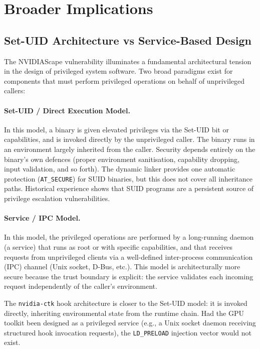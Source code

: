 \section{Broader Implications}
\label{sec:implications}

\subsection{Set-UID Architecture vs Service-Based Design}
\label{subsec:setuid-vs-service}

The NVIDIAScape vulnerability illuminates a fundamental architectural tension in the design of privileged system software. Two broad paradigms exist for components that must perform privileged operations on behalf of unprivileged callers:
 
\paragraph{Set-UID / Direct Execution Model.} In this model, a binary is given elevated privileges via the Set-UID bit or capabilities, and is invoked directly by the unprivileged caller. The binary runs in an environment largely inherited from the caller. Security depends entirely on the binary's own defences (proper environment sanitisation, capability dropping, input validation, and so forth). The dynamic linker provides one automatic protection (\texttt{AT\_SECURE}) for SUID binaries, but this does not cover all inheritance paths. Historical experience shows that SUID programs are a persistent source of privilege escalation vulnerabilities.
 
\paragraph{Service / IPC Model.} In this model, the privileged operations are performed by a long-running daemon (a service) that runs as root or with specific capabilities, and that receives requests from unprivileged clients via a well-defined inter-process communication (IPC) channel (Unix socket, D-Bus, etc.). This model is architecturally more secure because the trust boundary is explicit: the service validates each incoming request independently of the caller's environment.
 
The \texttt{nvidia-ctk} hook architecture is closer to the Set-UID model: it is invoked directly, inheriting environmental state from the runtime chain. Had the GPU toolkit been designed as a privileged service (e.g., a Unix socket daemon receiving structured hook invocation requests), the \texttt{LD\_PRELOAD} injection vector would not exist.
 
